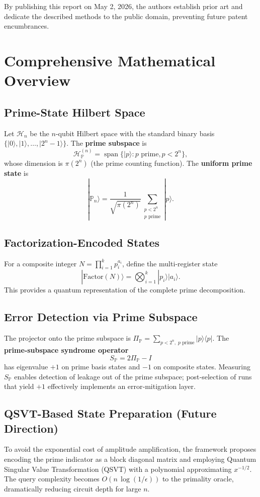 \documentclass[12pt,a4paper]{article}
\begin{document}
By publishing this report on May 2, 2026, the authors establish prior art and dedicate the described methods to the public domain, preventing future patent encumbrances.

\section{Comprehensive Mathematical Overview}

\subsection{Prime-State Hilbert Space}
Let \(\mathcal{H}_n\) be the \(n\)-qubit Hilbert space with the standard binary basis \(\{|0\rangle, |1\rangle, \dots, |2^n-1\rangle\}\). The \textbf{prime subspace} is
\[
\mathcal{H}_{\mathbb{P}}^{(n)} = \operatorname{span}\{|p\rangle : p \text{ prime}, p < 2^n\},
\]
whose dimension is \(\pi(2^n)\) (the prime counting function). The \textbf{uniform prime state} is
\[
|\mathbb{P}_n\rangle = \frac{1}{\sqrt{\pi(2^n)}} \sum_{\substack{p < 2^n \\ p \text{ prime}}} |p\rangle .
\]

\subsection{Factorization-Encoded States}
For a composite integer \(N = \prod_{i=1}^k p_i^{a_i}\), define the multi‑register state
\[
|\text{Factor}(N)\rangle = \bigotimes_{i=1}^k |p_i\rangle|a_i\rangle .
\]
This provides a quantum representation of the complete prime decomposition.

\subsection{Error Detection via Prime Subspace}
The projector onto the prime subspace is \(\Pi_{\mathbb{P}} = \sum_{p<2^n,\;p\text{ prime}} |p\rangle\langle p|\). The \textbf{prime‑subspace syndrome operator}
\[
S_{\mathbb{P}} = 2\Pi_{\mathbb{P}} - I
\]
has eigenvalue \(+1\) on prime basis states and \(-1\) on composite states. Measuring \(S_{\mathbb{P}}\) enables detection of leakage out of the prime subspace; post‑selection of runs that yield \(+1\) effectively implements an error‑mitigation layer.

\subsection{QSVT-Based State Preparation (Future Direction)}
To avoid the exponential cost of amplitude amplification, the framework proposes encoding the prime indicator as a block diagonal matrix and employing Quantum Singular Value Transformation (QSVT) with a polynomial approximating \(x^{-1/2}\). The query complexity becomes \(O(n\,\log(1/\epsilon))\) to the primality oracle, dramatically reducing circuit depth for large \(n\).
\end{document}
